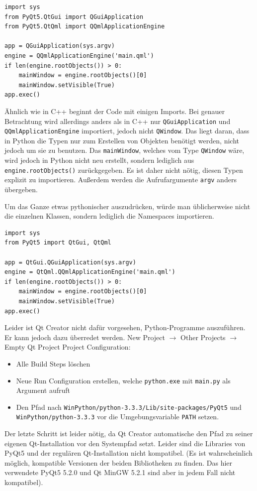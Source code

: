 \documentclass[a4paper]{article}
\begin{document}
\begin{verbatim}
import sys
from PyQt5.QtGui import QGuiApplication
from PyQt5.QtQml import QQmlApplicationEngine

app = QGuiApplication(sys.argv)
engine = QQmlApplicationEngine('main.qml')
if len(engine.rootObjects()) > 0:
    mainWindow = engine.rootObjects()[0]
    mainWindow.setVisible(True)
app.exec()
\end{verbatim}

Ähnlich wie in C++ beginnt der Code mit einigen Imports. Bei genauer Betrachtung wird allerdings anders als in C++ nur \verb~QGuiApplication~ und \verb~QQmlApplicationEngine~ importiert, jedoch nicht \verb~QWindow~. Das liegt daran, dass in Python die Typen nur zum Erstellen von Objekten benötigt werden, nicht jedoch um sie zu benutzen. Das \verb~mainWindow~, welches vom Type \verb~QWindow~ wäre, wird jedoch in Python nicht neu erstellt, sondern lediglich aus \verb~engine.rootObjects()~ zurückgegeben. Es ist daher nicht nötig, diesen Typen explizit zu importieren. Außerdem werden die Aufrufargumente \verb~argv~ anders übergeben.

Um das Ganze etwas pythonischer auszudrücken, würde man üblicherweise nicht die einzelnen Klassen, sondern lediglich die Namespaces importieren.

\begin{verbatim}
import sys
from PyQt5 import QtGui, QtQml

app = QtGui.QGuiApplication(sys.argv)
engine = QtQml.QQmlApplicationEngine('main.qml')
if len(engine.rootObjects()) > 0:
    mainWindow = engine.rootObjects()[0]
    mainWindow.setVisible(True)
app.exec()
\end{verbatim}

Leider ist Qt Creator nicht dafür vorgesehen, Python-Programme auszuführen. Er kann jedoch dazu überredet werden.
New Project $\rightarrow$ Other Projects $\rightarrow$ Empty Qt Project
Project Configuration:
\begin{itemize}
\item Alle Build Steps löschen
\item Neue Run Configuration erstellen, welche \verb~python.exe~ mit \verb~main.py~ als Argument aufruft
\item Den Pfad nach \verb~WinPython/python-3.3.3/Lib/site-packages/PyQt5~ und \verb~WinPython/python-3.3.3~ vor die Umgebungsvariable \verb~PATH~ setzen.
\end{itemize}

Der letzte Schritt ist leider nötig, da Qt Creator automatische den Pfad zu seiner eigenen Qt-Installation vor den Systempfad setzt. Leider sind die Libraries von PyQt5 und der regulären Qt-Installation nicht kompatibel. (Es ist wahrscheinlich möglich, kompatible Versionen der beiden Bibliotheken zu finden. Das hier verwendete PyQt5 5.2.0 und Qt MinGW 5.2.1 sind aber in jedem Fall nicht kompatibel).
\end{document}
